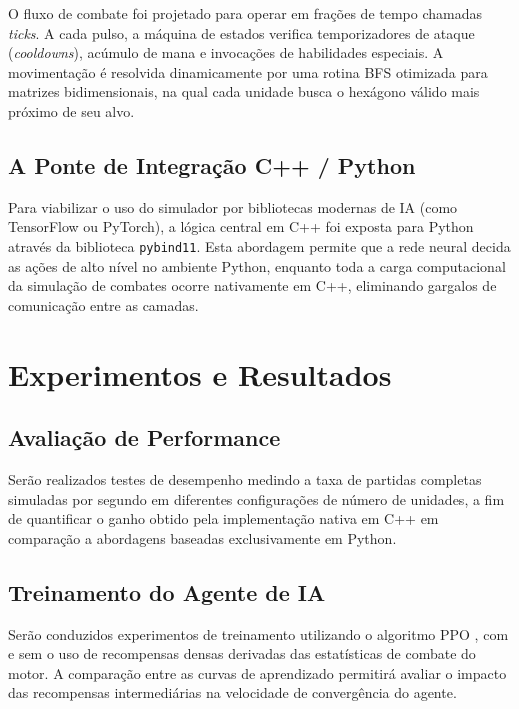 \documentclass[12pt]{article}
\begin{document}
O fluxo de combate foi projetado para operar em frações de tempo chamadas \textit{ticks}. A cada pulso, a máquina de estados verifica temporizadores de ataque (\textit{cooldowns}), acúmulo de mana e invocações de habilidades especiais. A movimentação é resolvida dinamicamente por uma rotina BFS otimizada para matrizes bidimensionais, na qual cada unidade busca o hexágono válido mais próximo de seu alvo.

\subsection{A Ponte de Integração C++ / Python}

Para viabilizar o uso do simulador por bibliotecas modernas de IA (como TensorFlow ou PyTorch), a lógica central em C++ foi exposta para Python através da biblioteca \texttt{pybind11}. Esta abordagem permite que a rede neural decida as ações de alto nível no ambiente Python, enquanto toda a carga computacional da simulação de combates ocorre nativamente em C++, eliminando gargalos de comunicação entre as camadas.

\section{Experimentos e Resultados} \label{sec:experimentos}

\subsection{Avaliação de Performance}

Serão realizados testes de desempenho medindo a taxa de partidas completas simuladas por segundo em diferentes configurações de número de unidades, a fim de quantificar o ganho obtido pela implementação nativa em C++ em comparação a abordagens baseadas exclusivamente em Python.

\subsection{Treinamento do Agente de IA}

Serão conduzidos experimentos de treinamento utilizando o algoritmo PPO \cite{schulman2017}, com e sem o uso de recompensas densas derivadas das estatísticas de combate do motor. A comparação entre as curvas de aprendizado permitirá avaliar o impacto das recompensas intermediárias na velocidade de convergência do agente.
\end{document}
